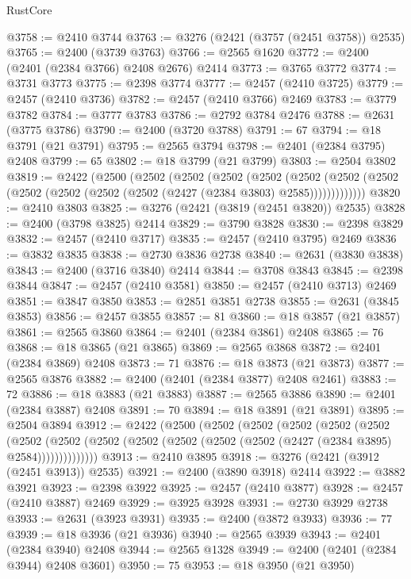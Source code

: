 \begin{lexlean}{RustCore}
\begin{coremodule}
@3758 := @2410 @3744
@3763 := @3276 (@2421 (@3757 (@2451 @3758)) @2535)
@3765 := @2400 (@3739 @3763)
@3766 := @2565 @1620
@3772 := @2400 (@2401 (@2384 @3766) @2408 @2676) @2414
@3773 := @3765 @3772
@3774 := @3731 @3773
@3775 := @2398 @3774
@3777 := @2457 (@2410 @3725)
@3779 := @2457 (@2410 @3736)
@3782 := @2457 (@2410 @3766) @2469
@3783 := @3779 @3782
@3784 := @3777 @3783
@3786 := @2792 @3784 @2476
@3788 := @2631 (@3775 @3786)
@3790 := @2400 (@3720 @3788)
@3791 := 67
@3794 := @18 @3791 (@21 @3791)
@3795 := @2565 @3794
@3798 := @2401 (@2384 @3795) @2408
@3799 := 65
@3802 := @18 @3799 (@21 @3799)
@3803 := @2504 @3802
@3819 := @2422
    (@2500
      (@2502
        (@2502
          (@2502
            (@2502
              (@2502
                (@2502 (@2502 (@2502 (@2502 (@2502 (@2502 (@2427 (@2384 @3803) @2585)))))))))))))
@3820 := @2410 @3803
@3825 := @3276 (@2421 (@3819 (@2451 @3820)) @2535)
@3828 := @2400 (@3798 @3825) @2414
@3829 := @3790 @3828
@3830 := @2398 @3829
@3832 := @2457 (@2410 @3717)
@3835 := @2457 (@2410 @3795) @2469
@3836 := @3832 @3835
@3838 := @2730 @3836 @2738
@3840 := @2631 (@3830 @3838)
@3843 := @2400 (@3716 @3840) @2414
@3844 := @3708 @3843
@3845 := @2398 @3844
@3847 := @2457 (@2410 @3581)
@3850 := @2457 (@2410 @3713) @2469
@3851 := @3847 @3850
@3853 := @2851 @3851 @2738
@3855 := @2631 (@3845 @3853)
@3856 := @2457 @3855
@3857 := 81
@3860 := @18 @3857 (@21 @3857)
@3861 := @2565 @3860
@3864 := @2401 (@2384 @3861) @2408
@3865 := 76
@3868 := @18 @3865 (@21 @3865)
@3869 := @2565 @3868
@3872 := @2401 (@2384 @3869) @2408
@3873 := 71
@3876 := @18 @3873 (@21 @3873)
@3877 := @2565 @3876
@3882 := @2400 (@2401 (@2384 @3877) @2408 @2461)
@3883 := 72
@3886 := @18 @3883 (@21 @3883)
@3887 := @2565 @3886
@3890 := @2401 (@2384 @3887) @2408
@3891 := 70
@3894 := @18 @3891 (@21 @3891)
@3895 := @2504 @3894
@3912 := @2422
    (@2500
      (@2502
        (@2502
          (@2502
            (@2502
              (@2502
                (@2502
                  (@2502 (@2502 (@2502 (@2502 (@2502 (@2502 (@2427 (@2384 @3895) @2584))))))))))))))
@3913 := @2410 @3895
@3918 := @3276 (@2421 (@3912 (@2451 @3913)) @2535)
@3921 := @2400 (@3890 @3918) @2414
@3922 := @3882 @3921
@3923 := @2398 @3922
@3925 := @2457 (@2410 @3877)
@3928 := @2457 (@2410 @3887) @2469
@3929 := @3925 @3928
@3931 := @2730 @3929 @2738
@3933 := @2631 (@3923 @3931)
@3935 := @2400 (@3872 @3933)
@3936 := 77
@3939 := @18 @3936 (@21 @3936)
@3940 := @2565 @3939
@3943 := @2401 (@2384 @3940) @2408
@3944 := @2565 @1328
@3949 := @2400 (@2401 (@2384 @3944) @2408 @3601)
@3950 := 75
@3953 := @18 @3950 (@21 @3950)

\end{coremodule}
\end{lexlean}
